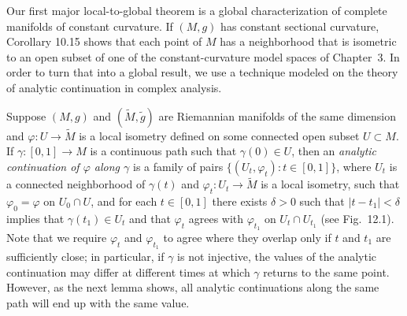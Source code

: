 Our first major local-to-global theorem is a global characterization of complete manifolds of constant curvature. If $(M,g)$ has constant sectional curvature, Corollary 10.15 shows that each point of $M$ has a neighborhood that is isometric to an open subset of one of the constant-curvature model spaces of Chapter~3. In order to turn that into a global result, we use a technique modeled on the theory of analytic continuation in complex analysis.


Suppose $(M, g)$ and $(\tilde{M}, \tilde{g})$ are Riemannian manifolds of the same dimension and $\varphi: U \to \tilde{M}$ is a local isometry defined on some connected open subset $U \subset M$. If $\gamma: [0, 1] \to M$ is a continuous path such that $\gamma(0) \in U$, then an \emph{analytic continuation of $\varphi$ along $\gamma$} is a family of pairs $\{(U_t, \varphi_t): t \in [0,1]\}$, where $U_t$ is a connected neighborhood of $\gamma(t)$ and $\varphi_t: U_t \to \tilde{M}$ is a local isometry, such that $\varphi_0 = \varphi$ on $U_0 \cap U$, and for each $t \in [0, 1]$ there exists $\delta > 0$ such that $|t - t_1| < \delta$ implies that $\gamma(t_1) \in U_t$ and that $\varphi_t$ agrees with $\varphi_{t_1}$ on $U_t \cap U_{t_1}$ (see Fig.~12.1). Note that we require $\varphi_t$ and $\varphi_{t_1}$ to agree where they overlap only if $t$ and $t_1$ are sufficiently close; in particular, if $\gamma$ is not injective, the values of the analytic continuation may differ at different times at which $\gamma$ returns to the same point. However, as the next lemma shows, all analytic continuations along the same path will end up with the same value.

